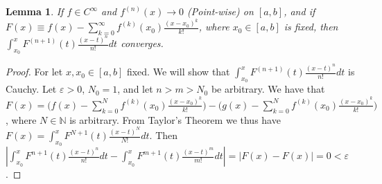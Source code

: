 \documentclass[12pt,oneside]{book}
\theoremstyle{mystyle}
\newtheorem{lemma}{Lemma}[section]
\begin{document}
\begin{lemma}
If $f\in C^{\infty}$ and $f^{(n)}(x)\rightarrow 0$ (Point-wise) on $[a,b]$, and if $F(x) \equiv f(x)-\sum_{k=0}^{\infty} f^{(k)}(x_0)\frac{(x-x_0)^{k}}{k!}$, where $x_0\in [a,b]$ is fixed, then $\int_{x_0}^{x} F^{(n+1)}(t)\frac{(x-t)^{n}}{n!}dt$ converges. 
\end{lemma}
\begin{proof}
For let $x,x_0\in [a,b]$ fixed. We will show that $\int_{x_0}^{x} F^{(n+1)}(t)\frac{(x-t)^{n}}{n!}dt$ is Cauchy. Let $\varepsilon>0$, $N_0 = 1$, and let $n>m>N_0$ be arbitrary. We have that $F(x) = \bigg(f(x)-\sum_{k=0}^{N} f^{(k)}(x_0)\frac{(x-x_0)^{k}}{k!}\bigg)-\bigg(g(x)-\sum_{k=0}^{N} f^{(k)}(x_0)\frac{(x-x_0)^{k}}{k!}\bigg)$, where $N\in \mathbb{N}$ is arbitrary. From Taylor's Theorem we thus have $F(x) = \int_{x_0}^{x}F^{N+1}(t)\frac{(x-t)^N}{N!}dt$. Then $|\int_{x_0}^{x}F^{n+1}(t)\frac{(x-t)^n}{n!}dt-\int_{x_0}^{x}F^{m+1}(t)\frac{(x-t)^m}{m!}dt| = |F(x)-F(x)|= 0 <\varepsilon$. 
\end{proof}
\end{document}
